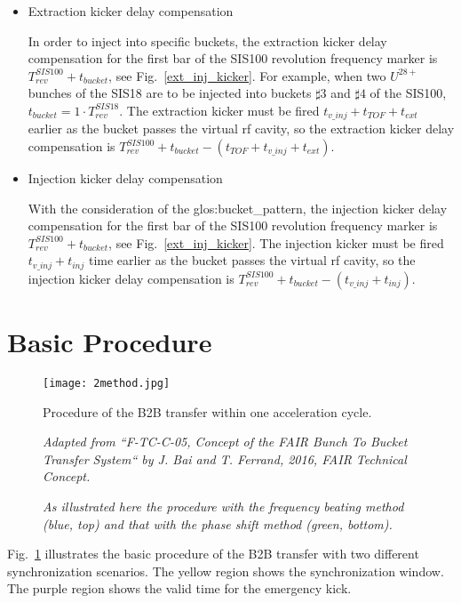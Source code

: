 \begin{itemize}
\item Extraction kicker delay compensation

In order to inject into specific buckets, the extraction kicker delay compensation for the first bar of the SIS100 revolution frequency marker is $T_{\mathit{rev}}^{\mathit{SIS100}} + t_{\mathit{bucket}}$, see Fig.~\ref{ext_inj_kicker}. For example, when two $U^{28+}$ bunches of the SIS18 are to be injected into buckets $\sharp3$ and $\sharp4$ of the SIS100, $t_{\mathit{bucket}} =1 \cdot T_{\mathit{rev}}^{\mathit{SIS18}}$. The extraction kicker must be fired $t_{\mathit{v\_inj}}+t_{\mathit{TOF}}+t_{\mathit{ext}}$ earlier as the bucket passes the virtual rf cavity, so the extraction kicker delay compensation is $T_{\mathit{rev}}^{\mathit{SIS100}} + t_{\mathit{bucket}} - (t_{\mathit{TOF}} + t_{\mathit{v\_inj}} + t_{\mathit{ext}})$. 

\item Injection kicker delay compensation 

With the consideration of the \gls{glos:bucket_pattern}, the injection kicker delay compensation for the first bar of the SIS100 revolution frequency marker is $T_{\mathit{rev}}^{\mathit{SIS100}} + t_{\mathit{bucket}}$, see Fig.~\ref{ext_inj_kicker}. The injection kicker must be fired $t_{\mathit{v\_inj}}+t_{\mathit{inj}}$ time earlier as the bucket passes the virtual rf cavity, so the injection kicker delay compensation is $T_{\mathit{rev}}^{\mathit{SIS100}} + t_{\mathit{bucket}} - (t_{\mathit{v\_inj}} + t_{\mathit{inj}})$.
\end{itemize}


\section{Basic Procedure}
\label{cpt_proc}
\begin{figure}[!htb]
   \centering   
   \texttt{[image: 2method.jpg]}
   \caption{Procedure of the B2B transfer within one acceleration cycle.}
    \caption*{\textsl{\small{Adapted from ``F-TC-C-05, Concept of the FAIR Bunch To Bucket Transfer System`` by J. Bai and T. Ferrand, 2016, FAIR Technical Concept. }}}
	\caption*{\textsl{\small{As illustrated here the procedure with the frequency beating method (blue, top) and that with the phase shift method (green, bottom).  }}}
   \label{2method}
\end{figure}
Fig.~\ref{2method} illustrates the basic procedure of the B2B transfer with two different synchronization scenarios. The yellow region shows the synchronization window. The purple region shows the valid time for the emergency kick. %



